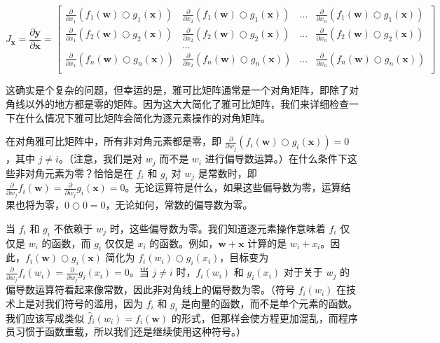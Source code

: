 \documentclass[lang=cn,newtx,10pt,scheme=chinese]{elegantbook}
\begin{document}
\[J_\mathbf{x} = 
\frac{\partial \mathbf{y}}{\partial \mathbf{x}}  = \begin{bmatrix}
\frac{\partial}{\partial x_1} ( f_{1}(\mathbf{w}) \bigcirc g_{1}(\mathbf{x}) ) & \frac{\partial}{\partial x_2} ( f_{1}(\mathbf{w}) \bigcirc g_{1}(\mathbf{x}) ) & \ldots & \frac{\partial}{\partial x_n} ( f_{1}(\mathbf{w}) \bigcirc g_{1}(\mathbf{x}) )\\
\frac{\partial}{\partial x_1} ( f_{2}(\mathbf{w}) \bigcirc g_{2}(\mathbf{x}) ) & \frac{\partial}{\partial x_2} ( f_{2}(\mathbf{w}) \bigcirc g_{2}(\mathbf{x}) ) & \ldots & \frac{\partial}{\partial x_n} ( f_{2}(\mathbf{w}) \bigcirc g_{2}(\mathbf{x}) )\\
& \ldots\\
\frac{\partial}{\partial x_1} ( f_{n}(\mathbf{w}) \bigcirc g_{n}(\mathbf{x}) ) & \frac{\partial}{\partial x_2} ( f_{n}(\mathbf{w}) \bigcirc g_{n}(\mathbf{x}) ) & \ldots & \frac{\partial}{\partial x_n} ( f_{n}(\mathbf{w}) \bigcirc g_{n}(\mathbf{x}) )\\
\end{bmatrix}\]

这确实是个复杂的问题，但幸运的是，雅可比矩阵通常是一个对角矩阵，即除了对角线以外的地方都是零的矩阵。因为这大大简化了雅可比矩阵，我们来详细检查一下在什么情况下雅可比矩阵会简化为逐元素操作的对角矩阵。

在对角雅可比矩阵中，所有非对角元素都是零，即 $\frac{\partial}{\partial w_j} ( f_i(\mathbf{w}) \bigcirc g_i(\mathbf{x}) ) = 0$，其中 $j \neq i$。（注意，我们是对 $w_j$ 而不是 $w_i$ 进行偏导数运算。）在什么条件下这些非对角元素为零？恰恰是在 $f_i$ 和 $g_i$ 对 $w_j$ 是常数时，即 $\frac{\partial}{\partial w_j} f_i(\mathbf{w}) = \frac{\partial}{\partial w_j} g_i(\mathbf{x}) = 0$。无论运算符是什么，如果这些偏导数为零，运算结果也将为零，$0 \bigcirc 0 = 0$，无论如何，常数的偏导数为零。

当 $f_i$ 和 $g_i$ 不依赖于 $w_j$ 时，这些偏导数为零。我们知道逐元素操作意味着 $f_i$ 仅仅是 $w_i$ 的函数，而 $g_i$ 仅仅是 $x_i$ 的函数。例如，$\mathbf{w}+\mathbf{x}$ 计算的是 $w_i + x_i$。因此，$f_i(\mathbf{w}) \bigcirc g_i(\mathbf{x})$ 简化为 $f_i(w_i) \bigcirc g_i(x_i)$，目标变为 $\frac{\partial}{\partial w_j} f_i(w_i) = \frac{\partial}{\partial w_j} g_i(x_i) = 0$。当 $j \neq i$ 时，$f_i(w_i)$ 和 $g_i(x_i)$ 对于关于 $w_j$ 的偏导数运算符看起来像常数，因此非对角线上的偏导数为零。（符号 $f_i(w_i)$ 在技术上是对我们符号的滥用，因为 $f_i$ 和 $g_i$ 是向量的函数，而不是单个元素的函数。我们应该写成类似 $\hat f_{i}(w_i) = f_{i}(\mathbf{w})$ 的形式，但那样会使方程更加混乱，而程序员习惯于函数重载，所以我们还是继续使用这种符号。）
\end{document}
